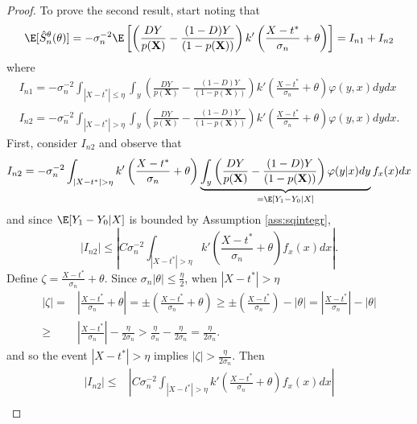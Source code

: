 {\begin{proof}
        To prove the second result, start noting that
        \begin{gather}
            \E[\hat{S}^\theta_n(\theta)] = -\sigma_n^{-2} \E \left[ \left(\frac{D Y}{p(\textbf{X})} - \frac{(1-D) Y}{(1-p(\textbf{X}))} \right) k'\left(\frac{X - t^*}{\sigma_n} + \theta \right) \right] = I_{n1} + I_{n2}
        \end{gather}
        where
        \begin{gather}
            I_{n1} = -\sigma_n^{-2} \int_{|X-t^*| \leq \eta} \int_y \left(\frac{D Y}{p(\textbf{X})} - \frac{(1-D) Y}{(1-p(\textbf{X}))} \right) k'\left(\frac{X - t^*}{\sigma_n} + \theta \right) \varphi(y,x) dy dx \\
            I_{n2} = -\sigma_n^{-2} \int_{|X-t^*|>\eta} \int_y \left(\frac{D Y}{p(\textbf{X})} - \frac{(1-D) Y}{(1-p(\textbf{X}))} \right) k'\left(\frac{X - t^*}{\sigma_n} + \theta \right) \varphi(y,x) dy dx.
        \end{gather}
        First, consider $I_{n2}$ and observe that
        \begin{gather}
            I_{n2} = -\sigma_n^{-2} \int_{|X-t^*|>\eta} k'\left(\frac{X - t^*}{\sigma_n} + \theta \right) \underbrace{\int_y \left(\frac{D Y}{p(\textbf{X})} - \frac{(1-D) Y}{(1-p(\textbf{X}))} \right)  \varphi(y|x) dy}_{= \E[Y_1 - Y_0 |X]} f_x(x) dx
        \end{gather}
        and since $\E[Y_1 - Y_0 |X]$ is bounded by Assumption \ref{ass:sqintegr}, $$|I_{n2}| \leq \left|C \sigma_n^{-2} \int_{|X-t^*|>\eta} k'\left(\frac{X - t^*}{\sigma_n} + \theta \right) f_x(x) dx \right|.$$ Define $\zeta = \frac{X - t^*}{\sigma_n} + \theta$. Since $\sigma_n |\theta| \leq \frac{\eta}{2}$, when $|X-t^*| > \eta$
        \begin{align}
            |\zeta| =& \left| \frac{X - t^*}{\sigma_n} + \theta \right| = \pm  \left( \frac{X - t^*}{\sigma_n} + \theta \right) \geq \pm  \left( \frac{X - t^*}{\sigma_n}\right) - |\theta | = \left| \frac{X - t^*}{\sigma_n}\right| - |\theta |  \\
            \geq& \left| \frac{X - t^*}{\sigma_n}\right| - \frac{\eta}{2 \sigma_n} > \frac{\eta}{\sigma_n}- \frac{\eta}{2 \sigma_n} = \frac{\eta}{2 \sigma_n}.
        \end{align}
        and so the event $|X-t^*| > \eta$ implies $|\zeta| > \frac{\eta}{2 \sigma_n}$. Then
        \begin{align}
            |I_{n2}| \leq & \left| C \sigma_n^{-2} \int_{|X-t^*|>\eta} k'\left(\frac{X - t^*}{\sigma_n} + \theta \right) f_x(x) dx \right| \\

\end{align}
\end{proof}}
